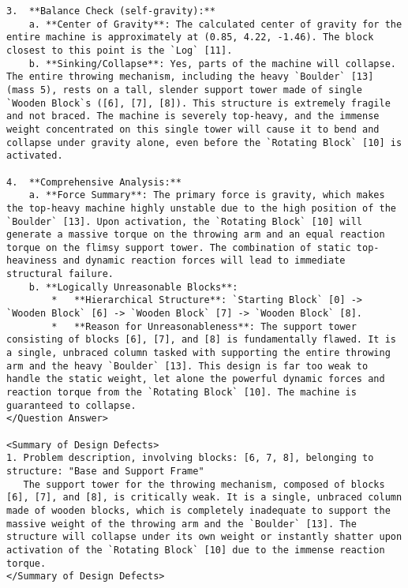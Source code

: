 \begin{lstlisting}
3.  **Balance Check (self-gravity):**
    a. **Center of Gravity**: The calculated center of gravity for the entire machine is approximately at (0.85, 4.22, -1.46). The block closest to this point is the `Log` [11].
    b. **Sinking/Collapse**: Yes, parts of the machine will collapse. The entire throwing mechanism, including the heavy `Boulder` [13] (mass 5), rests on a tall, slender support tower made of single `Wooden Block`s ([6], [7], [8]). This structure is extremely fragile and not braced. The machine is severely top-heavy, and the immense weight concentrated on this single tower will cause it to bend and collapse under gravity alone, even before the `Rotating Block` [10] is activated.

4.  **Comprehensive Analysis:**
    a. **Force Summary**: The primary force is gravity, which makes the top-heavy machine highly unstable due to the high position of the `Boulder` [13]. Upon activation, the `Rotating Block` [10] will generate a massive torque on the throwing arm and an equal reaction torque on the flimsy support tower. The combination of static top-heaviness and dynamic reaction forces will lead to immediate structural failure.
    b. **Logically Unreasonable Blocks**:
        *   **Hierarchical Structure**: `Starting Block` [0] -> `Wooden Block` [6] -> `Wooden Block` [7] -> `Wooden Block` [8].
        *   **Reason for Unreasonableness**: The support tower consisting of blocks [6], [7], and [8] is fundamentally flawed. It is a single, unbraced column tasked with supporting the entire throwing arm and the heavy `Boulder` [13]. This design is far too weak to handle the static weight, let alone the powerful dynamic forces and reaction torque from the `Rotating Block` [10]. The machine is guaranteed to collapse.
</Question Answer>

<Summary of Design Defects>
1. Problem description, involving blocks: [6, 7, 8], belonging to structure: "Base and Support Frame"
   The support tower for the throwing mechanism, composed of blocks [6], [7], and [8], is critically weak. It is a single, unbraced column made of wooden blocks, which is completely inadequate to support the massive weight of the throwing arm and the `Boulder` [13]. The structure will collapse under its own weight or instantly shatter upon activation of the `Rotating Block` [10] due to the immense reaction torque.
</Summary of Design Defects>
\end{lstlisting}

